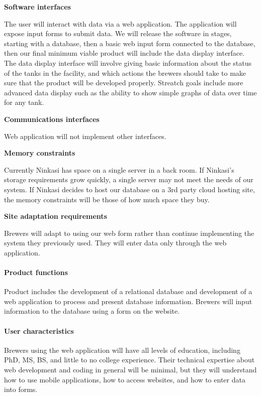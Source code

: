 		\textbf{Software interfaces}

			The user will interact with data via a web application.
			The application will expose input forms to submit data.
			We will release the software in stages, starting with a database, then a basic web input form connected to the database, then our final minimum viable product will include the data display interface.
			The data display interface will involve giving basic information about the status of the tanks in the facility, and which actions the brewers should take to make sure that the product will be developed properly.
			Streatch goals include more advanced data display such as the ability to show simple graphs of data over time for any tank.

		\textbf{Communications interfaces}

			Web application will not implement other interfaces.

		\textbf{Memory constraints}

			Currently Ninkasi has space on a single server in a back room.
			If Ninkasi's storage requirements grow quickly, a single server may not meet the needs of our system.
			If Ninkasi decides to host our database on a 3rd party cloud hosting site, the memory constraints will be those of how much space they buy.

		\textbf{Site adaptation requirements}

			Brewers will adapt to using our web form rather than continue implementing the system they previously used.
			They will enter data only through the web application.

	\paragraph{Product functions}
		Product includes the development of a relational database and development of a web application to process and present database information.
		Brewers will input information to the database using a form on the website.

	\paragraph{User characteristics}
		Brewers using the web application will have all levels of education, including PhD, MS, BS, and little to no college experience.
		Their technical expertise about web development and coding in general will be minimal, but they will understand how to use mobile applications, how to access websites, and how to enter data into forms.

